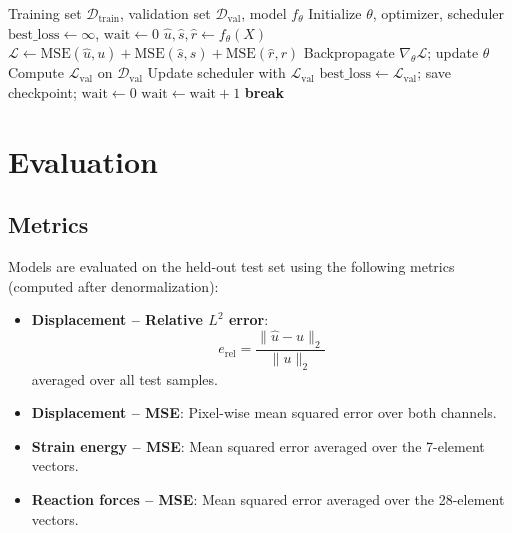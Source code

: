 \documentclass[11pt,a4paper]{article}
\begin{document}
\begin{algorithm}[H]
\caption{Multi-Task Training Loop}
\label{alg:training}
\begin{algorithmic}[1]
\Require Training set $\mathcal{D}_\text{train}$, validation set
         $\mathcal{D}_\text{val}$, model $f_\theta$
\State Initialize $\theta$, optimizer, scheduler
\State $\text{best\_loss} \gets \infty$, $\text{wait} \gets 0$
        \State $\hat{u}, \hat{s}, \hat{r} \gets f_\theta(X)$
        \State $\mathcal{L} \gets \text{MSE}(\hat{u}, u) + \text{MSE}(\hat{s}, s)
               + \text{MSE}(\hat{r}, r)$
        \State Backpropagate $\nabla_\theta \mathcal{L}$; update $\theta$
    \EndFor
    \State Compute $\mathcal{L}_\text{val}$ on $\mathcal{D}_\text{val}$
    \State Update scheduler with $\mathcal{L}_\text{val}$
        \State $\text{best\_loss} \gets \mathcal{L}_\text{val}$;
               save checkpoint; $\text{wait} \gets 0$
    \Else
        \State $\text{wait} \gets \text{wait} + 1$
    \EndIf
        \State \textbf{break} 
    \EndIf
\EndFor
\end{algorithmic}
\end{algorithm}


\section{Evaluation}
\label{sec:evaluation}

\subsection{Metrics}

Models are evaluated on the held-out test set using the following metrics
(computed after denormalization):

\begin{itemize}[leftmargin=2em]
    \item \textbf{Displacement -- Relative $L^2$ error}:
    \[
        e_\text{rel} = \frac{\| \hat{u} - u \|_2}{\| u \|_2}
    \]
    averaged over all test samples.

    \item \textbf{Displacement -- MSE}: Pixel-wise mean squared error over
          both channels.

    \item \textbf{Strain energy -- MSE}: Mean squared error averaged over the
          7-element vectors.

    \item \textbf{Reaction forces -- MSE}: Mean squared error averaged over
          the 28-element vectors.
\end{itemize}
\end{document}
